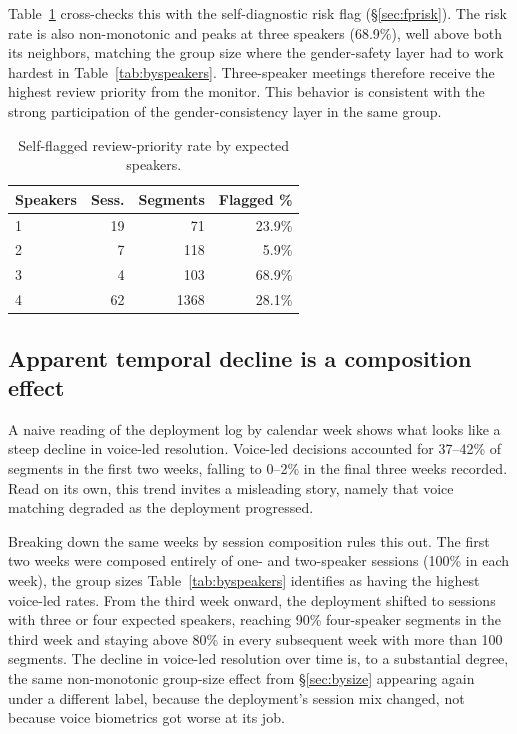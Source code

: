 \documentclass[conference]{IEEEtran}
\begin{document}
Table~\ref{tab:fprisk} cross-checks this with the self-diagnostic risk
flag (\S\ref{sec:fprisk}). The risk rate is also non-monotonic and
peaks at three speakers (68.9\%), well above both its
neighbors, matching the group size where the gender-safety layer had
to work hardest in Table~\ref{tab:byspeakers}. Three-speaker meetings
therefore receive the highest review priority from the monitor. This
behavior is consistent with the strong participation of the
gender-consistency layer in the same group.

\begin{table}[h]
\caption{Self-flagged review-priority rate by expected speakers.}
\begin{center}
\begin{tabular}{lrrr}
\hline
\textbf{Speakers} & \textbf{Sess.} & \textbf{Segments} & \textbf{Flagged \%} \\
\hline
1 & 19 &   71 & 23.9\% \\
2 &  7 &  118 &  5.9\% \\
3 &  4 &  103 & 68.9\% \\
4 & 62 & 1368 & 28.1\% \\
\hline
\end{tabular}
\label{tab:fprisk}
\end{center}
\end{table}

\subsection{Apparent temporal decline is a composition effect}
\label{sec:bytime}

A naive reading of the deployment log by calendar week shows what
looks like a steep decline in voice-led resolution. Voice-led
decisions accounted for 37--42\% of segments in the first two weeks,
falling to 0--2\% in the final three weeks recorded. Read on its own,
this trend invites a misleading story, namely that voice matching
degraded as the deployment progressed.

Breaking down the same weeks by session composition rules this out.
The first two weeks were composed entirely of one- and two-speaker
sessions (100\% in each week), the group sizes Table~\ref{tab:byspeakers}
identifies as having the highest voice-led rates. From the third week
onward, the deployment shifted to sessions with three or four expected
speakers, reaching 90\% four-speaker segments in the third week and
staying above 80\% in every subsequent week with more than 100
segments. The decline in voice-led resolution over time is, to a
substantial degree, the same non-monotonic group-size effect from
\S\ref{sec:bysize} appearing again under a different label, because the
deployment's session mix changed, not because voice biometrics got
worse at its job.
\end{document}
